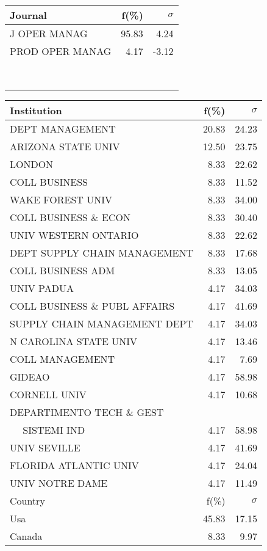 \documentclass[a4paper,11pt]{report}
\begin{document}
\begin{landscape}
\begin{table}[!ht]
{\begin{tabular}{|l r r|}
\hline
\hline
Journal & f(\%) & $\sigma$\\
\hline
J OPER MANAG & 95.83 & 4.24\\
PROD OPER MANAG & 4.17 & -3.12\\
 &  & \\
 &  & \\
 &  & \\
 &  & \\
 &  & \\
 &  & \\
 &  & \\
 &  & \\
\hline
\end{tabular}
}
{\scriptsize\begin{tabular}{|l r r|}
\hline
Institution & f(\%) & $\sigma$\\
\hline
DEPT MANAGEMENT & 20.83 & 24.23\\
ARIZONA STATE UNIV & 12.50 & 23.75\\
LONDON & 8.33 & 22.62\\
COLL BUSINESS & 8.33 & 11.52\\
WAKE FOREST UNIV & 8.33 & 34.00\\
COLL BUSINESS \& ECON & 8.33 & 30.40\\
UNIV WESTERN ONTARIO & 8.33 & 22.62\\
DEPT SUPPLY CHAIN MANAGEMENT & 8.33 & 17.68\\
COLL BUSINESS ADM & 8.33 & 13.05\\
UNIV PADUA & 4.17 & 34.03\\
COLL BUSINESS \& PUBL AFFAIRS & 4.17 & 41.69\\
SUPPLY CHAIN MANAGEMENT DEPT & 4.17 & 34.03\\
N CAROLINA STATE UNIV & 4.17 & 13.46\\
COLL MANAGEMENT & 4.17 & 7.69\\
GIDEAO & 4.17 & 58.98\\
CORNELL UNIV & 4.17 & 10.68\\
DEPARTIMENTO TECH \& GEST &  & \\
$\quad$ SISTEMI IND & 4.17 & 58.98\\
UNIV SEVILLE & 4.17 & 41.69\\
FLORIDA ATLANTIC UNIV & 4.17 & 24.04\\
UNIV NOTRE DAME & 4.17 & 11.49\\
\hline
\hline
Country & f(\%) & $\sigma$\\
\hline
Usa & 45.83 & 17.15\\
Canada & 8.33 & 9.97\\

\end{tabular}}
\end{table}
\end{landscape}
\end{document}
